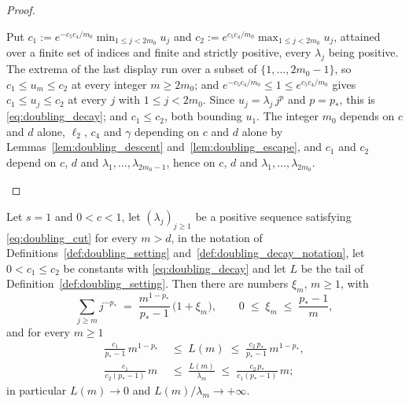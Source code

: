 \begin{proof}
\begin{itemize}
    Put $c_1:=e^{-c_5c_4/m_0}\min_{1\leq j<2m_0}u_j$ and
    $c_2:=e^{c_5c_4/m_0}\max_{1\leq j<2m_0}u_j$, attained over a finite set of indices and
    finite and strictly positive, every $\lambda_j$ being positive. The extrema of the last
    display run over a subset of $\{1,\dots,2m_0-1\}$, so $c_1\leq u_m\leq c_2$ at every
    integer $m\geq2m_0$; and $e^{-c_5c_4/m_0}\leq1\leq e^{c_5c_4/m_0}$ gives
    $c_1\leq u_j\leq c_2$ at every $j$ with $1\leq j<2m_0$. Since $u_j=\lambda_j\,j^{p}$ and
    $p=p_*$, this is \eqref{eq:doubling_decay}; and $c_1\leq c_2$, both bounding $u_1$. The
    integer $m_0$ depends on $c$ and $d$ alone, $\ell_2$, $c_4$ and $\gamma$ depending on $c$
    and $d$ alone by Lemmas~\ref{lem:doubling_descent} and~\ref{lem:doubling_escape}, and
    $c_1$ and $c_2$ depend on $c$, $d$ and $\lambda_1,\dots,\lambda_{2m_0-1}$, hence on $c$,
    $d$ and $\lambda_1,\dots,\lambda_{2m_0}$.
\end{itemize}
\end{proof}

\begin{corollary}\label{cor:doubling_tail}
Let $s=1$ and $0<c<1$, let $(\lambda_j)_{j\geq1}$ be a positive sequence satisfying
\eqref{eq:doubling_cut} for every $m>d$, in the notation of
Definitions~\ref{def:doubling_setting} and~\ref{def:doubling_decay_notation}, let
$0<c_1\leq c_2$ be constants with \eqref{eq:doubling_decay} and let $L$ be the tail of
Definition~\ref{def:doubling_setting}. Then there are numbers $\xi_m$, $m\geq1$, with
\begin{equation}\label{eq:doubling_powertail}
    \sum_{j\geq m}j^{-p_*}\;=\;\frac{m^{1-p_*}}{p_*-1}\,\bigl(1+\xi_m\bigr),
    \qquad 0\;\leq\;\xi_m\;\leq\;\frac{p_*-1}{m} ,
\end{equation}
and for every $m\geq1$
\begin{equation}\label{eq:doubling_tailratio}
\begin{aligned}
    \frac{c_1}{p_*-1}\,m^{1-p_*}\;&\leq\;L(m)\;\leq\;\frac{c_2\,p_*}{p_*-1}\,m^{1-p_*},\\
    \frac{c_1}{c_2(p_*-1)}\,m\;&\leq\;\frac{L(m)}{\lambda_m}\;\leq\;\frac{c_2\,p_*}{c_1(p_*-1)}\,m ;
\end{aligned}
\end{equation}
in particular $L(m)\rightarrow0$ and $L(m)/\lambda_m\rightarrow+\infty$.
\end{corollary}

